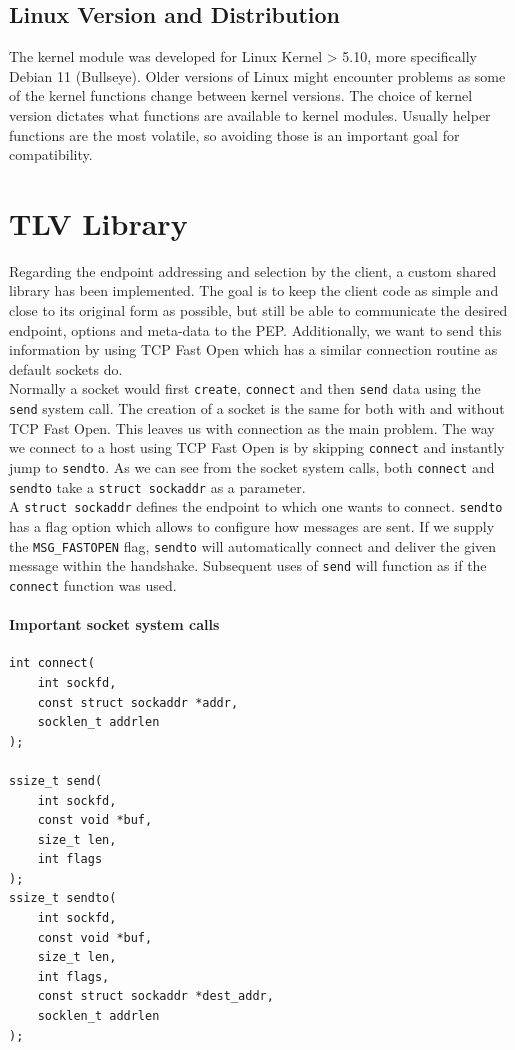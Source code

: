 \documentclass[a4paper,english, 12pt]{report}
\begin{document}
\subsection{Linux Version and Distribution}
The kernel module was developed for Linux Kernel > 5.10, more specifically Debian 11 (Bullseye). Older versions of Linux might encounter problems as some of the kernel functions change between kernel versions. The choice of kernel version dictates what functions are available to kernel modules. Usually helper functions are the most volatile, so avoiding those is an important goal for compatibility.

\section{TLV Library}
Regarding the endpoint addressing and selection by the client, a custom shared library has been implemented. The goal is to keep the client code as simple and close to its original form as possible, but still be able to communicate the desired endpoint, options and meta-data to the PEP. Additionally, we want to send this information by using TCP Fast Open which has a similar connection routine as default sockets do.\\

Normally a socket would first \verb|create|, \verb|connect| and then \verb|send| data using the \verb|send| system call. The creation of a socket is the same for both with and without TCP Fast Open. This leaves us with connection as the main problem. The way we connect to a host using TCP Fast Open is by skipping \verb|connect| and instantly jump to \verb|sendto|. As we can see from the socket system calls, both \verb|connect| and \verb|sendto| take a \verb|struct sockaddr| as a parameter.\\

A \verb|struct sockaddr| defines the endpoint to which one wants to connect. \verb|sendto| has a flag option which allows to configure how messages are sent. If we supply the \verb|MSG_FASTOPEN| flag, \verb|sendto| will automatically connect and deliver the given message within the handshake. Subsequent uses of \verb|send| will function as if the \verb|connect| function was used.\\

\noindent\begin{minipage}{\linewidth}
\paragraph{Important socket system calls}
\begin{verbatim}
int connect(
    int sockfd,
    const struct sockaddr *addr,
    socklen_t addrlen
);

ssize_t send(
    int sockfd,
    const void *buf,
    size_t len,
    int flags
);
ssize_t sendto(
    int sockfd,
    const void *buf,
    size_t len,
    int flags,
    const struct sockaddr *dest_addr,
    socklen_t addrlen
);
\end{verbatim}
\end{minipage}\\
\end{document}
